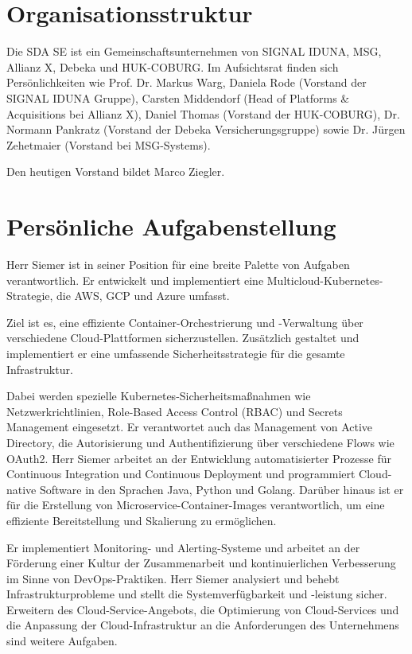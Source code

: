 \section{Organisationsstruktur}
\label{sec:intro:organisationsstruktur}
Die SDA SE ist ein Gemeinschaftsunternehmen von SIGNAL IDUNA, MSG, Allianz X, Debeka und HUK-COBURG.
Im Aufsichtsrat finden sich Persönlichkeiten wie Prof. Dr. Markus Warg, Daniela Rode (Vorstand der SIGNAL IDUNA Gruppe), Carsten Middendorf (Head of Platforms & Acquisitions bei Allianz X), Daniel Thomas (Vorstand der HUK-COBURG), Dr. Normann Pankratz (Vorstand der Debeka Versicherungsgruppe) sowie Dr. Jürgen Zehetmaier (Vorstand bei MSG-Systems).
\medskip

\noindent
Den heutigen Vorstand bildet Marco Ziegler.

\section{Persönliche Aufgabenstellung}
\label{sec:intro:persoenliche-aufgabenstellung}
Herr Siemer ist in seiner Position für eine breite Palette von Aufgaben verantwortlich.
Er entwickelt und implementiert eine Multicloud-Kubernetes-Strategie, die AWS, GCP und Azure umfasst.
\medskip

\noindent
Ziel ist es, eine effiziente Container-Orchestrierung und -Verwaltung über verschiedene Cloud-Plattformen sicherzustellen.
Zusätzlich gestaltet und implementiert er eine umfassende Sicherheitsstrategie für die gesamte Infrastruktur.
\medskip

\noindent
Dabei werden spezielle Kubernetes-Sicherheitsmaßnahmen wie Netzwerkrichtlinien, Role-Based Access Control (RBAC) und Secrets Management eingesetzt.
Er verantwortet auch das Management von Active Directory, die Autorisierung und Authentifizierung über verschiedene Flows wie OAuth2.
Herr Siemer arbeitet an der Entwicklung automatisierter Prozesse für Continuous Integration und Continuous Deployment und programmiert Cloud-native Software in den Sprachen Java, Python und Golang.
Darüber hinaus ist er für die Erstellung von Microservice-Container-Images verantwortlich, um eine effiziente Bereitstellung und Skalierung zu ermöglichen.
\medskip

\noindent
Er implementiert Monitoring- und Alerting-Systeme und arbeitet an der Förderung einer Kultur der Zusammenarbeit und kontinuierlichen Verbesserung im Sinne von DevOps-Praktiken.
Herr Siemer analysiert und behebt Infrastrukturprobleme und stellt die Systemverfügbarkeit und -leistung sicher.
Erweitern des Cloud-Service-Angebots, die Optimierung von Cloud-Services und die Anpassung der Cloud-Infrastruktur an die Anforderungen des Unternehmens sind weitere Aufgaben.
